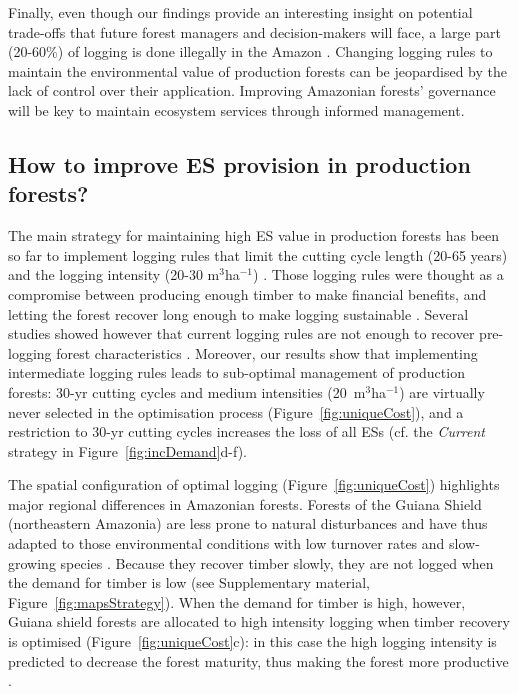 \documentclass{article}
\begin{document}
Finally, even though our findings provide an interesting insight on potential trade-offs that future forest managers and decision-makers will face, a large part (20-60\%) of logging is done illegally in the Amazon \cite{Finer2014,Brancalion2018}. Changing logging rules to maintain the environmental value of production forests can be jeopardised by the lack of control over their application. Improving Amazonian forests' governance will be key to maintain ecosystem services through informed management. 

\subsection{How to improve ES provision in production forests?}

The main strategy for maintaining high ES value in production forests has been so far to implement logging rules that limit the cutting cycle length (20-65 years) and the logging intensity (20-30 m$^3$ha$^{-1}$) \cite{Blaser2011}. 
Those logging rules were thought as a compromise between producing enough timber to make financial benefits, and letting the forest recover long enough to make logging sustainable \cite{Seydack2012}.
Several studies showed however that current logging rules are not enough to recover pre-logging forest characteristics \cite{Zimmerman2012}.
Moreover, our results show that implementing intermediate logging rules leads to sub-optimal management of production forests: 30-yr cutting cycles and medium intensities (20~m$^3$ha$^{-1}$) are virtually never selected in the optimisation process (Figure~\ref{fig:uniqueCost}), and a restriction to 30-yr cutting cycles increases the loss of all ESs (cf. the \textit{Current} strategy in Figure~\ref{fig:incDemand}d-f).  

The spatial configuration of optimal logging (Figure~\ref{fig:uniqueCost}) highlights major regional differences in Amazonian forests. Forests of the Guiana Shield (northeastern Amazonia) are less prone to natural disturbances \cite{Espirito-Santo2014} and have thus adapted to those environmental conditions with low turnover rates and slow-growing species \cite{Johnson2016,Quesada2012}. 
Because they recover timber slowly, they are not logged when the demand for timber is low (see Supplementary material, Figure~\ref{fig:mapsStrategy}). 
When the demand for timber is high, however, Guiana shield forests are allocated to high intensity logging when timber recovery is optimised (Figure~\ref{fig:uniqueCost}c): in this case the high logging intensity is predicted to decrease the forest maturity, thus making the forest more productive \cite{Piponiot2018,Roedig2018,Perez-Espana1999}.
\end{document}
